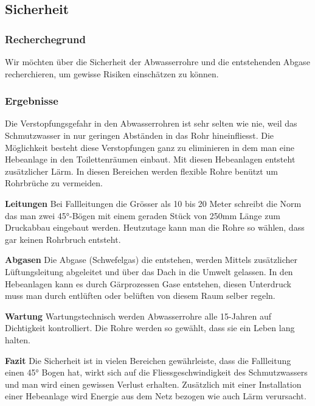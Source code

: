\subsection{Sicherheit}


\subsubsection{Recherchegrund}
Wir möchten über die Sicherheit der Abwasserrohre und die entstehenden Abgase recherchieren, um gewisse Risiken einschätzen zu können. 

\subsubsection{Ergebnisse}

Die Verstopfungsgefahr in den Abwasserrohren ist sehr selten wie nie, weil das Schmutzwasser in nur geringen Abständen in das Rohr hineinfliesst. Die Möglichkeit besteht diese Verstopfungen ganz zu eliminieren in dem man eine Hebeanlage in den Toilettenräumen einbaut. Mit diesen Hebeanlagen entsteht zusätzlicher Lärm. In diesen Bereichen werden flexible Rohre benützt um Rohrbrüche zu vermeiden.

\textbf{Leitungen}
Bei Fallleitungen die Grösser als 10 bis 20 Meter schreibt die Norm das man zwei 45°-Bögen mit einem geraden Stück von 250mm Länge zum Druckabbau eingebaut werden. Heutzutage kann man die Rohre so wählen, dass gar keinen Rohrbruch entsteht.

\textbf{Abgasen}
Die Abgase (Schwefelgas) die entstehen, werden Mittels zusätzlicher Lüftungsleitung abgeleitet und über das Dach in die Umwelt gelassen. In den Hebeanlagen kann es durch Gärprozessen Gase entstehen, diesen Unterdruck muss man durch entlüften oder belüften von diesem Raum selber regeln. 

\textbf{Wartung}
Wartungstechnisch werden Abwasserrohre alle 15-Jahren auf Dichtigkeit kontrolliert. Die Rohre werden so gewählt, dass sie ein Leben lang halten.

\textbf{Fazit}
Die Sicherheit ist in vielen Bereichen gewährleiste, dass die Fallleitung einen 45° Bogen hat, wirkt sich auf die Fliessgeschwindigkeit des Schmutzwassers und man wird einen gewissen Verlust erhalten. Zusätzlich mit einer Installation einer Hebeanlage wird Energie aus dem Netz bezogen wie auch Lärm verursacht.

\clearpage 





